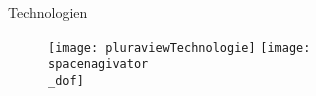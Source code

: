 \begin{frame}[t]
\begin{columns}[t]
\begin{column}{.465\textwidth}
\vspace{0.125cm}

\end{column}


\begin{column}{.025\textwidth}\end{column} %

\begin{column}{0.465\textwidth}

\begin{block}{Technologien}
   \begin{figure}
       \texttt{[image: pluraviewTechnologie]}
       \texttt{[image: spacenagivator\\\_dof]}
   \end{figure}
   
   
     
   
   
\end{block}


\end{column} %



\begin{column}{.025\textwidth}\end{column} %

\end{columns} %




\end{frame}
